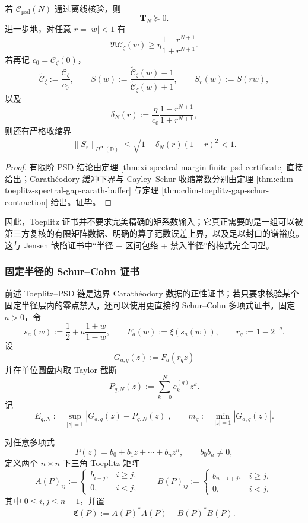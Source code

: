 \begin{proposition}\label{prop:typed-address-biaxial-completion-compiled-psd-certificate}
若 \(\mathcal C_{\mathrm{psd}}(N)\) 通过离线核验，则
\[
\mathbf{T}_N\succeq 0.
\]
进一步地，对任意 \(r=|w|<1\) 有
\[
\Re \mathscr{C}_{\zeta}(w)\ge \eta\frac{1-r^{N+1}}{1+r^{N+1}}.
\]
若再记 \(c_0=\mathscr{C}_{\zeta}(0)\)，
\[
\widetilde{\mathscr{C}}_{\zeta}:=\frac{\mathscr{C}_{\zeta}}{c_0},
\qquad
S(w):=\frac{\widetilde{\mathscr{C}}_{\zeta}(w)-1}{\widetilde{\mathscr{C}}_{\zeta}(w)+1},
\qquad
S_r(w):=S(rw),
\]
以及
\[
\delta_N(r):=\frac{\eta}{c_0}\frac{1-r^{N+1}}{1+r^{N+1}},
\]
则还有严格收缩界
\[
\|S_r\|_{H^\infty(\mathbb D)}
\le
\sqrt{1-\delta_N(r)(1-r)^2}
<1.
\]
\end{proposition}
\begin{proof}
有限阶 PSD 结论由定理 \ref{thm:xi-spectral-margin-finite-psd-certificate} 直接给出；Carath\'eodory 缓冲下界与 Cayley--Schur 收缩常数分别由定理 \ref{thm:cdim-toeplitz-spectral-gap-carath-buffer} 与定理 \ref{thm:cdim-toeplitz-gap-schur-contraction} 给出。证毕。
\end{proof}

因此，Toeplitz 证书并不要求完美精确的矩系数输入；它真正需要的是一组可以被第三方复核的有限矩阵数据、明确的算子范数误差上界，以及足以封口的谱裕度。这与 Jensen 缺陷证书中“半径 + 区间包络 + 禁入半径”的格式完全同型。

\subsubsection{固定半径的 Schur--Cohn 证书}\label{subsubsec:typed-address-biaxial-completion-fixed-radius-schur-cohn-certificate}
前述 Toeplitz--PSD 链是边界 Carath\'eodory 数据的正性证书；若只要求核验某个固定半径层内的零点禁入，还可以使用更直接的 Schur--Cohn 多项式证书。固定 \(a>0\)，令
\[
s_a(w):=\frac12+a\frac{1+w}{1-w},
\qquad
F_a(w):=\xi(s_a(w)),
\qquad
r_q:=1-2^{-q}.
\]
设
\[
G_{a,q}(z):=F_a(r_qz)
\]
并在单位圆盘内取 Taylor 截断
\[
P_{q,N}(z):=\sum_{k=0}^{N}c_k^{(q)}z^k.
\]
记
\[
E_{q,N}:=\sup_{|z|=1}|G_{a,q}(z)-P_{q,N}(z)|,
\qquad
m_q:=\min_{|z|=1}|G_{a,q}(z)|.
\]

对任意多项式
\[
P(z)=b_0+b_1z+\cdots+b_nz^n,
\qquad b_0b_n\ne0,
\]
定义两个 \(n\times n\) 下三角 Toeplitz 矩阵
\[
A(P)_{ij}:=
\begin{cases}
b_{i-j},& i\ge j,\\
0,& i<j,
\end{cases}
\qquad
B(P)_{ij}:=
\begin{cases}
\overline{b_{n-i+j}},& i\ge j,\\
0,& i<j,
\end{cases}
\]
其中 \(0\le i,j\le n-1\)，并置
\[
\mathfrak C(P):=A(P)^*A(P)-B(P)^*B(P).
\]

